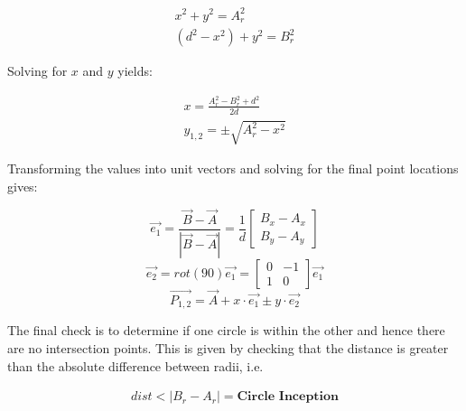 \documentclass[11pt,twoside]{report}
\begin{document}
\begin{equation}
\begin{aligned}
x^{2} + y^{2} = A_{r}^{2} \\
(d^{2}-x^{2}) + y^{2} = B_{r}^{2}
\end{aligned}
\label{inter_point_eq1}
\end{equation}


Solving for $x$ and $y$ yields:

\begin{equation}
\begin{aligned}
x = \frac{A_{r}^{2} - B_{r}^{2} + d^{2}}{2d} \\
y_{1,2} = \pm \sqrt{A_{r}^{2} - x^{2}}
\end{aligned}
\label{inter_point_eq2}
\end{equation}

Transforming the values into unit vectors and solving for the final point locations gives:

\begin{equation}
 \overrightarrow{e_{1}} = \frac{ \overrightarrow{B}- \overrightarrow{A}}{|  \overrightarrow{B} -  \overrightarrow{A} |} 
= 
\frac{1}{d}
\begin{bmatrix}
B_{x} - A_{x} \\
B_{y} - A_{y}
\end{bmatrix} 
\end{equation}
\begin{equation}
\overrightarrow{e_{2}} =
rot(90) \overrightarrow{e_{1}} =
\begin{bmatrix}
0 & -1 \\
1 & 0
\end{bmatrix}
\overrightarrow{e_{1}}
\end{equation}
\begin{equation}
\overrightarrow{P_{1,2}} = \overrightarrow{A}+x \cdot \overrightarrow{e_{1}} \pm y \cdot \overrightarrow{e_{2}}
\label{inter_point_eq3}
\end{equation}

The final check is to determine if one circle is within the other and hence there are no intersection points. This is given by checking that the distance is greater than the absolute difference between radii, i.e.


\begin{equation}
\begin{aligned}
dist < |B_{r} - A_{r}| = \textbf{Circle Inception}
\end{aligned}
\label{circle_inception}
\end{equation}
\end{document}
